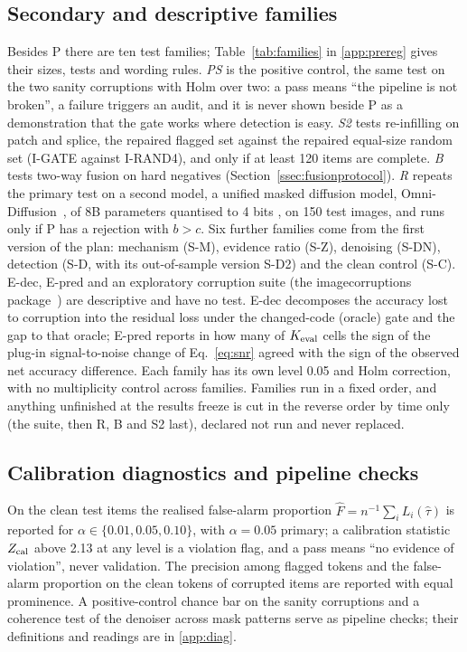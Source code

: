 \subsection{Secondary and descriptive families}\label{ssec:families}
Besides P there are ten test families; Table~\ref{tab:families} in \ref{app:prereg} gives their sizes, tests and wording rules.
\emph{PS} is the positive control, the same test on the two sanity corruptions with Holm over two: a pass means ``the pipeline is not
broken'', a failure triggers an audit, and it is never shown beside P as a demonstration that the gate works where detection is easy.
\emph{S2} tests re-infilling on patch and splice, the repaired flagged set against the repaired equal-size random set (I-GATE against
I-RAND4), and only if at least 120 items are complete.
\emph{B} tests two-way fusion on hard negatives (Section~\ref{ssec:fusionprotocol}).
\emph{R} repeats the primary test on a second model, a unified masked diffusion model, Omni-Diffusion~\cite{li2026omnidiffusion}, of 8B parameters quantised to 4 bits
, on 150 test images, and runs only if P has a rejection with $b>c$.
Six further families come from the first version of the plan: mechanism (S-M), evidence ratio (S-Z), denoising (S-DN), detection
(S-D, with its out-of-sample version S-D2) and the clean control (S-C).
E-dec, E-pred and an exploratory corruption suite (the imagecorruptions package~\cite{michaelis2019imagecorruptions}) are descriptive and have no test.
E-dec decomposes the accuracy lost to corruption into the residual loss under the changed-code (oracle) gate and the gap to that
oracle; E-pred reports in how many of $K_{\rm eval}$ cells the sign of the plug-in signal-to-noise change of Eq.~\eqref{eq:snr}
agreed with the sign of the observed net accuracy difference.
Each family has its own level 0.05 and Holm correction, with no multiplicity control across families.
Families run in a fixed order, and anything unfinished at the results freeze is cut in the reverse order by time only (the suite,
then R, B and S2 last), declared not run and never replaced.

\subsection{Calibration diagnostics and pipeline checks}\label{ssec:diagnostics}
On the clean test items the realised false-alarm proportion $\hat F=n^{-1}\sum_i L_i(\hat\tau)$ is reported for
$\alpha\in\{0.01,0.05,0.10\}$, with $\alpha=0.05$ primary; a calibration statistic $Z_{\rm cal}$ above 2.13 at any level is a
violation flag, and a pass means ``no evidence of violation'', never validation.
The precision among flagged tokens and the false-alarm proportion on the clean tokens of corrupted items are reported with equal
prominence.
A positive-control chance bar on the sanity corruptions and a coherence test of the denoiser across mask patterns serve as pipeline
checks; their definitions and readings are in \ref{app:diag}.

